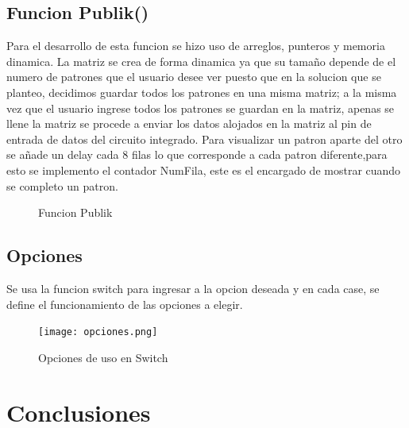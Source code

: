 \documentclass{article}
\begin{document}
\subsection{Funcion Publik()}
Para el desarrollo de esta funcion se hizo uso de arreglos, punteros y memoria dinamica. La matriz se crea de forma dinamica ya que su tamaño depende de el numero de patrones que el usuario desee ver puesto que en la solucion que se planteo, decidimos guardar todos los patrones en una misma matriz; a la misma vez que el usuario ingrese todos los patrones se guardan en la matriz, apenas se llene la matriz se procede a enviar los datos alojados en la matriz al pin de entrada de datos del circuito integrado.
Para visualizar un patron aparte del otro se añade un delay cada 8 filas lo que corresponde a cada patron diferente,para esto se implemento el contador NumFila, este es el encargado de mostrar cuando se completo un patron.

\begin{figure}
 \centering
 \caption{Funcion Publik}
 \label{f:Publik}
\end{figure}
    

\subsection{Opciones}
Se usa la funcion switch para ingresar a la opcion deseada y en cada case, se define el funcionamiento de las opciones a elegir.
    \begin{figure}[h]
    \texttt{[image: opciones.png]}
    \centering
    \caption{Opciones de uso en Switch}
    \label{fig:opciones}
    \end{figure}


\section{Conclusiones} 
\label{Algoritmo}





\end{document}
